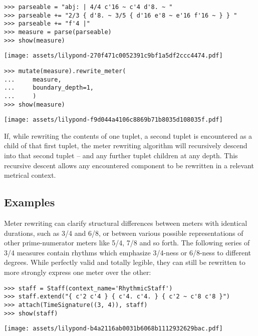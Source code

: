 \begin{abjadbookoutput}
\begin{singlespacing}
\vspace{-0.5\baselineskip}
\begin{verbatim}
>>> parseable = "abj: | 4/4 c'16 ~ c'4 d'8. ~ "
>>> parseable += "2/3 { d'8. ~ 3/5 { d'16 e'8 ~ e'16 f'16 ~ } } "
>>> parseable += "f'4 |"
>>> measure = parse(parseable)
>>> show(measure)
\end{verbatim}
\noindent\texttt{[image: assets/lilypond-270f471c0052391c9bf1a5df2ccc4474.pdf]}
\begin{verbatim}
>>> mutate(measure).rewrite_meter(
...     measure,
...     boundary_depth=1,
...     )
>>> show(measure)
\end{verbatim}
\noindent\texttt{[image: assets/lilypond-f9d044a4106c8869b71b8035d108035f.pdf]}
\end{singlespacing}
\end{abjadbookoutput}

\noindent If, while rewriting the contents of one tuplet, a second tuplet is
encountered as a child of that first tuplet, the meter rewriting algorithm will
recursively descend into that second tuplet -- and any further tuplet children
at any depth. This recursive descent allows any encountered component to be
rewritten in a relevant metrical context.

\subsection{Examples}

Meter rewriting can clarify structural differences between meters with
identical durations, such as 3/4 and 6/8, or between various possible
representations of other prime-numerator meters like 5/4, 7/8 and so forth.
The following series of 3/4 measures contain rhythms which emphasize 3/4-ness
or 6/8-ness to different degrees. While perfectly valid and totally legible,
they can still be rewritten to more strongly express one meter over the other:

\begin{comment}
<abjad>
staff = Staff(context_name='RhythmicStaff')
staff.extend("{ c'2 c'4 } { c'4. c'4. } { c'2 ~ c'8 c'8 }")
attach(TimeSignature((3, 4)), staff)
show(staff)
</abjad>
\end{comment}

\begin{abjadbookoutput}
\begin{singlespacing}
\vspace{-0.5\baselineskip}
\begin{verbatim}
>>> staff = Staff(context_name='RhythmicStaff')
>>> staff.extend("{ c'2 c'4 } { c'4. c'4. } { c'2 ~ c'8 c'8 }")
>>> attach(TimeSignature((3, 4)), staff)
>>> show(staff)
\end{verbatim}
\noindent\texttt{[image: assets/lilypond-b4a2116ab0031b6068b1112932629bac.pdf]}
\end{singlespacing}
\end{abjadbookoutput}

